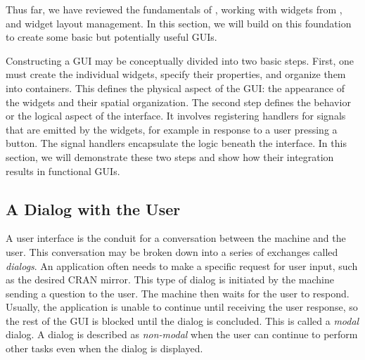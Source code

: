 \documentclass[article]{jss}
\begin{document}
Thus far, we have reviewed the fundamentals of , working with
 widgets from , and widget layout management. In this
section, we will build on this foundation to create some basic but potentially
useful GUIs. 

Constructing a GUI may be conceptually divided into two basic steps.
First, one must create the individual widgets, specify their properties,
and organize them into containers. This defines the physical aspect
of the GUI: the appearance of the widgets and their spatial organization.
The second step defines the behavior or the logical aspect of the
interface. It involves registering handlers for signals that are emitted
by the widgets, for example in response to a user pressing a button.
The signal handlers encapsulate the logic beneath the interface. In this
section, we will demonstrate these two steps and show how their integration
results in functional GUIs.

\subsection{A Dialog with the User}\label{sec:dialog-example}

A user interface is the conduit for a conversation between the machine and the
user. This conversation may be broken down into a series of exchanges called 
\emph{dialogs}. An application often needs to make a specific request
for user input, such as the desired CRAN mirror. This type of dialog is 
initiated by the machine sending a question to the user. The machine then
waits for the user to respond. Usually, the application is unable to continue
until receiving the user response, so the rest of the GUI is blocked until
the dialog is concluded. This is called a \emph{modal} dialog.
A dialog is described as \emph{non-modal} when the user can continue
to perform other tasks even when the dialog is displayed.
\end{document}
